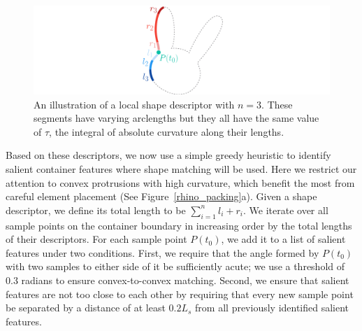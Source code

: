 \begin{figure}[t]
\centering
\includegraphics[width=1.0\textwidth]{figures/repulsionpak/descriptor_2.pdf}
\caption[A local shape descriptor for shape matching]
{\label{fig_shape_matching}
An illustration of a local shape descriptor with $n = 3$. 
These segments have varying arclengths but they all have the same value
of $\tau$, the integral of absolute curvature along their lengths.
}
\end{figure}



Based on these descriptors, we now use a simple greedy heuristic to identify salient container features where shape matching will be used.
Here we restrict our attention to convex protrusions with high curvature, which benefit the most from careful element placement (See Figure~\ref{rhino_packing}a).  Given a shape descriptor, we define its total length to be $\sum_{i=1}^nl_i+r_i$.  We iterate over all sample points on the container boundary in increasing order by the total lengths of their descriptors.  For each sample point $P(t_0)$, we add it to a list of salient features under two conditions. First, we require that the angle formed by $P(t_0)$ with two samples to either side of it be sufficiently acute; we use a threshold of 0.3 radians to ensure convex-to-convex matching.
Second, we ensure that salient features are not too close to each other by requiring that every new sample point be separated by a distance of at least $0.2L_s$ from all previously identified salient features.



